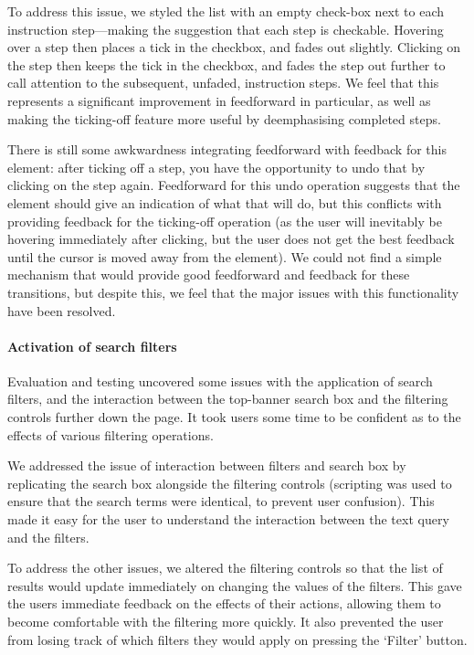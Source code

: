 To address this issue, we styled the list with an empty check-box next
to each instruction step---making the suggestion that each step is
checkable. Hovering over a step then places a tick in the checkbox,
and fades out slightly. Clicking on the step then keeps the tick in
the checkbox, and fades the step out further to call attention to the
subsequent, unfaded, instruction steps. We feel that this represents a
significant improvement in feedforward in particular, as well as
making the ticking-off feature more useful by deemphasising completed
steps.

There is still some awkwardness integrating feedforward with feedback
for this element: after ticking off a step, you have the opportunity
to undo that by clicking on the step again. Feedforward for this undo
operation suggests that the element should give an indication of what
that will do, but this conflicts with providing feedback for the
ticking-off operation (as the user will inevitably be hovering
immediately after clicking, but the user does not get the best
feedback until the cursor is moved away from the element). We could
not find a simple mechanism that would provide good feedforward and
feedback for these transitions, but despite this, we feel that the
major issues with this functionality have been resolved.

\paragraph{Activation of search filters}
Evaluation and testing uncovered some issues with the application of
search filters, and the interaction between the top-banner search box
and the filtering controls further down the page. It took users some
time to be confident as to the effects of various filtering
operations.

We addressed the issue of interaction between filters and search box
by replicating the search box alongside the filtering controls
(scripting was used to ensure that the search terms were identical, to
prevent user confusion). This made it easy for the user to understand
the interaction between the text query and the filters.

To address the other issues, we altered the filtering controls so that
the list of results would update immediately on changing the values of
the filters. This gave the users immediate feedback on the effects of
their actions, allowing them to become comfortable with the filtering
more quickly. It also prevented the user from losing track of which
filters they would apply on pressing the `Filter' button.
